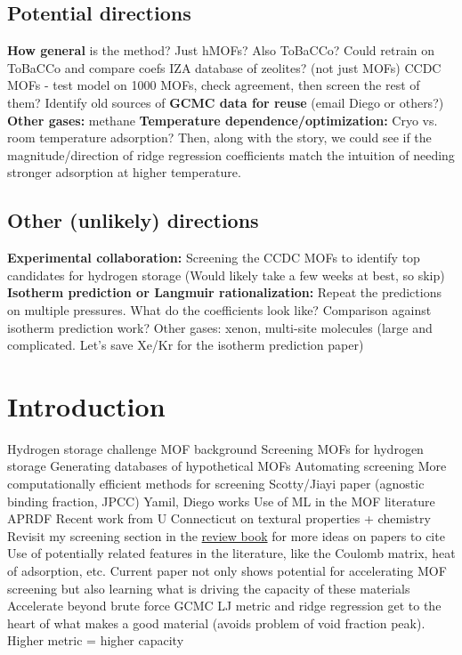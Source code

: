 \documentclass[letterpaper]{article}
\begin{document}
\subsection{Potential directions}
\begin{outline}
	\1 \textbf{How general} is the method?  Just hMOFs?  Also ToBaCCo?
		\2 Could retrain on ToBaCCo and compare coefs
		\2 IZA database of zeolites? (not just MOFs)
		\2 CCDC MOFs - test model on 1000 MOFs, check agreement, then screen the rest of them?
	\1 Identify old sources of \textbf{GCMC data for reuse} (email Diego or others?)
	\1 \textbf{Other gases:} methane
	\1 \textbf{Temperature dependence/optimization:} Cryo vs. room temperature adsorption?
		\2 Then, along with the story, we could see if the magnitude/direction of ridge regression coefficients match the intuition of needing stronger adsorption at higher temperature.
\end{outline}

\subsection{Other (unlikely) directions}
\begin{outline}
\1 \textbf{Experimental collaboration:} Screening the CCDC MOFs to identify top candidates for hydrogen storage (Would likely take a few weeks at best, so skip)
\1 \textbf{Isotherm prediction or Langmuir rationalization:} Repeat the predictions on multiple pressures.  What do the coefficients look like?  Comparison against isotherm prediction work?
\1 Other gases: xenon, multi-site molecules (large and complicated.  Let's save Xe/Kr for the isotherm prediction paper)
\end{outline}


\section{Introduction}

\begin{outline}
	\1 Hydrogen storage challenge
	\1 MOF background
	\1 Screening MOFs for hydrogen storage
		\2 Generating databases of hypothetical MOFs
		\2 Automating screening
		\2 More computationally efficient methods for screening
		\2 Scotty/Jiayi paper (agnostic binding fraction, JPCC)
		\2 Yamil, Diego works
	\1 Use of ML in the MOF literature
		\2 APRDF
		\2 Recent work from U Connecticut on textural properties + chemistry
		\2 Revisit my screening section in the \href{https://www.elsevier.com/books/modelling-and-simulation-in-the-science-of-micro-and-meso-porous-materials/catlow/978-0-12-805057-6}{review book} for more ideas on papers to cite
		\2 Use of potentially related features in the literature, like the Coulomb matrix, heat of adsorption, etc.
	\1 Current paper not only shows potential for accelerating MOF screening but also learning what is driving the capacity of these materials
		\2 Accelerate beyond brute force GCMC
		\2 LJ metric and ridge regression get to the heart of what makes a good material (avoids problem of void fraction peak).  Higher metric = higher capacity
\end{outline}
\end{document}
